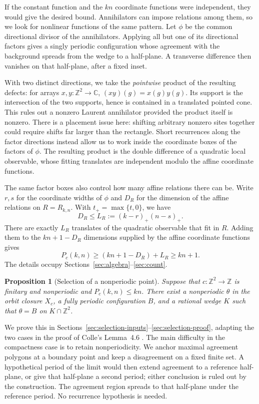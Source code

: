 \documentclass[11pt]{article}
\numberwithin{equation}{section}
\newtheorem{proposition}[theorem]{Proposition}
\theoremstyle{definition}
\theoremstyle{remark}
\newcommand{\Z}{\mathbb Z}
\newcommand{\C}{\mathbb C}
\newcommand{\Rect}{R_{k,n}}
\begin{document}
If the constant function and the $kn$ coordinate functions were independent, they would give the desired bound. Annihilators can impose relations among them, so we look for nonlinear functions of the
same pattern. Let $\phi$ be the common directional divisor of the annihilators. Applying all but one
of its directional factors gives a singly periodic configuration whose agreement with the background
spreads from the wedge to a half-plane. A transverse difference then vanishes on that half-plane,
after a fixed inset.

With two distinct directions, we take the \emph{pointwise} product of the resulting defects:
for arrays $x,y:\Z^2\to\C$, $(xy)(g)=x(g)y(g)$. Its support is the intersection of
the two supports, hence is contained in a translated pointed cone. This rules out a nonzero Laurent
annihilator provided the product itself is nonzero.
There is a placement issue here: shifting arbitrary nonzero sites together could require shifts far
larger than the rectangle. Short recurrences along the factor directions instead allow us to work
inside the coordinate boxes of the factors of $\phi$. The resulting product is the double difference
of a quadratic local observable, whose fitting translates are independent modulo the affine
coordinate functions.

The same factor boxes also control how many affine relations there can be. Write $r,s$ for the
coordinate widths of $\phi$ and $D_R$ for the dimension of the affine relations on $R=\Rect$. With
$t_+=\max\{t,0\}$, we have
\[
 D_R\le L_R:=(k-r)_+(n-s)_+.
\]
There are exactly $L_R$ translates of the quadratic observable that fit in $R$. Adding them to the
$kn+1-D_R$ dimensions supplied by the affine coordinate functions gives
\[
 P_c(k,n)\ge (kn+1-D_R)+L_R\ge kn+1.
\]
The details occupy Sections~\ref{sec:algebra}--\ref{sec:count}.

\begin{proposition}[Selection of a nonperiodic point]\label{prop:selection}
Suppose that $c:\Z^2\to\Z$ is finitary and nonperiodic and $P_c(k,n)\le kn$. There exist a
nonperiodic $\theta$ in the orbit closure $X_c$, a fully periodic configuration $B$, and a rational
wedge $K$ such that $\theta=B$ on $K\cap\Z^2$.
\end{proposition}

We prove this in Sections~\ref{sec:selection-inputs}--\ref{sec:selection-proof}, adapting the two
cases in the proof of Colle's Lemma~4.6 \cite{Colle}. The main difficulty in the compactness case is to retain nonperiodicity. We anchor
maximal agreement polygons at a boundary point and keep a disagreement on a fixed finite set. A
hypothetical period of the limit would then extend agreement to a reference half-plane, or give that
half-plane a second period; either conclusion is ruled out by the construction. The agreement region
spreads to that half-plane under the reference period. No recurrence hypothesis is needed.
\end{document}
